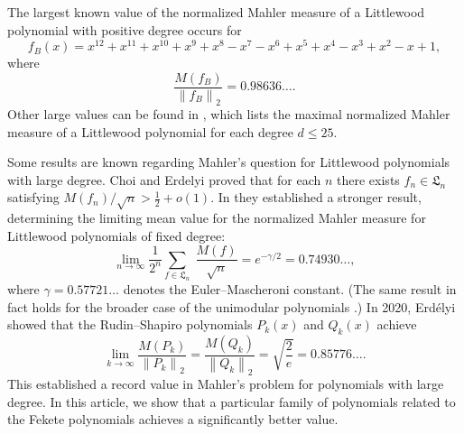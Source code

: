 \documentclass[reqno]{amsart}
\numberwithin{equation}{section}
\numberwithin{table}{section}
\numberwithin{figure}{section}
\newcommand{\dbars}[1]{\left\lVert#1\right\rVert}
\newcommand{\littlewood}[0]{\mathfrak{L}}
\begin{document}
The largest known value of the normalized Mahler measure of a Littlewood polynomial with positive degree occurs for
\begin{equation*}
f_B(x) = x^{12}+x^{11}+x^{10}+x^9+x^8-x^7-x^6+x^5+x^4-x^3+x^2-x+1,
\end{equation*}
where
\[
\frac{M(f_B)}{\dbars{f_B}_2} = 0.98636\ldots.
\]
Other large values can be found in \cite[Table~2]{BM08}, which lists the maximal normalized Mahler measure of a Littlewood polynomial for each degree $d\leq 25$.

Some results are known regarding Mahler's question for Littlewood polynomials with large degree.
Choi and Erdelyi \cite{CE15} proved that for each $n$ there exists $f_n\in\littlewood_n$ satisfying $M(f_n)/\sqrt{n} > \frac{1}{2} + o(1)$.
In \cite{CE14} they established a stronger result, determining the limiting mean value for the normalized Mahler measure for Littlewood polynomials of fixed degree:
\begin{equation}\label{eqnMeanMMLW}
\lim_{n\to\infty} \frac{1}{2^n} \sum_{f\in\littlewood_n} \; \frac{M(f)}{\sqrt{n}} = e^{-\gamma/2} = 0.74930\ldots,
\end{equation}
where $\gamma=0.57721\ldots$ denotes the Euler--Mascheroni constant.
(The same result in fact holds for the broader case of the unimodular polynomials \cite{CM11}.)
In 2020, Erd\'elyi \cite{Erdelyi20} showed that the Rudin--Shapiro polynomials $P_k(x)$ and $Q_k(x)$ achieve
\begin{equation*}
\lim_{k\to\infty} \frac{M(P_k)}{\dbars{P_k}_2} = \frac{M(Q_k)}{\dbars{Q_k}_2} = \sqrt{\frac{2}{e}} = 0.85776\ldots.
\end{equation*}
This established a record value in Mahler's problem for polynomials with large degree.
In this article, we show that a particular family of polynomials related to the Fekete polynomials achieves a significantly better value.
\end{document}
